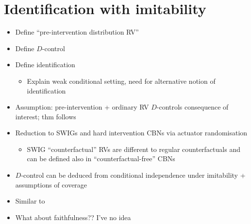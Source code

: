 \section{Identification with imitability}

\begin{itemize}
    \item Define ``pre-intervention distribution RV''
    \item Define $D$-control
    \item Define identification
    \begin{itemize}
        \item Explain weak conditional setting, need for alternative notion of identification
    \end{itemize}
    \item Assumption: pre-intervention + ordinary RV $D$-controls consequence of interest; thm follows
    \item Reduction to SWIGs and hard intervention CBNs via actuator randomisation
    \begin{itemize}
        \item SWIG ``counterfactual'' RVs are different to regular counterfactuals and can be defined also in ``counterfactual-free'' CBNs
    \end{itemize}
\end{itemize}

\begin{itemize}
    \item $D$-control can be deduced from conditional independence under imitability + assumptions of coverage
    \item Similar to \cite{peters_causal_2016}
    \item What about faithfulness?? I've no idea
\end{itemize}